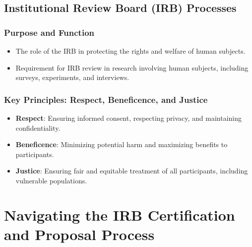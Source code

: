 \documentclass[
]{book}
\begin{document}
\hypertarget{institutional-review-board-irb-processes}{%
\section*{Institutional Review Board (IRB) Processes}\label{institutional-review-board-irb-processes}}

\hypertarget{purpose-and-function}{%
\subsection*{Purpose and Function}\label{purpose-and-function}}

\begin{itemize}
\item
  The role of the IRB in protecting the rights and welfare of human subjects.
\item
  Requirement for IRB review in research involving human subjects, including surveys, experiments, and interviews.
\end{itemize}

\hypertarget{key-principles-respect-beneficence-and-justice}{%
\subsection*{Key Principles: Respect, Beneficence, and Justice}\label{key-principles-respect-beneficence-and-justice}}

\begin{itemize}
\item
  \textbf{Respect}: Ensuring informed consent, respecting privacy, and maintaining confidentiality.
\item
  \textbf{Beneficence}: Minimizing potential harm and maximizing benefits to participants.
\item
  \textbf{Justice}: Ensuring fair and equitable treatment of all participants, including vulnerable populations.
\end{itemize}

\hypertarget{navigating-the-irb-certification-and-proposal-process}{%
\chapter*{Navigating the IRB Certification and Proposal Process}\label{navigating-the-irb-certification-and-proposal-process}}
\end{document}

